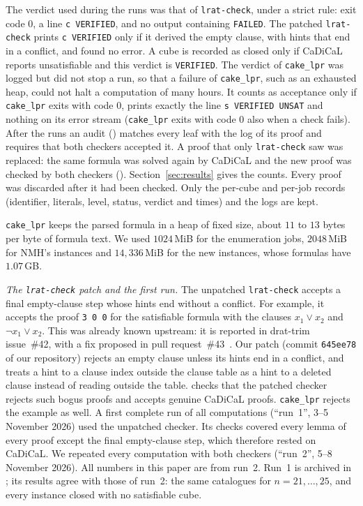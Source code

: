 \documentclass[11pt]{amsart}
\theoremstyle{definition}
\theoremstyle{remark}
\begin{document}
The verdict used during the runs was that of \texttt{lrat-check}, under a
strict rule: exit code $0$, a line \texttt{c VERIFIED}, and no output
containing \texttt{FAILED}. The patched \texttt{lrat-check} prints
\texttt{c VERIFIED} only if it derived the empty clause, with hints that end
in a conflict, and found no error.
A cube is recorded as closed only if CaDiCaL reports unsatisfiable and this
verdict is \texttt{VERIFIED}. The verdict of \texttt{cake\_lpr} was logged
but did not stop a run, so that a failure of \texttt{cake\_lpr}, such as an
exhausted heap, could not halt a computation of many hours. It counts as
acceptance only if \texttt{cake\_lpr} exits with code $0$, prints exactly the
line \texttt{s VERIFIED UNSAT} and nothing on its error stream
(\texttt{cake\_lpr} exits with code $0$ also when a check fails). After the
runs an audit
() matches every leaf with the log of its
proof and requires that both checkers accepted it. A proof that only
\texttt{lrat-check} saw was replaced: the same formula was solved again by
CaDiCaL and the new proof was checked by both checkers
(). Section~\ref{sec:results} gives the
counts. Every proof was discarded after it had been checked. Only the
per-cube and per-job records (identifier, literals, level, status, verdict and
times) and the logs are kept.

\texttt{cake\_lpr} keeps the parsed formula in a heap of fixed size, about
$11$ to $13$ bytes per byte of formula text. We used $1024$\,MiB for the
enumeration jobs, $2048$\,MiB for NMH's instances and $14{,}336$\,MiB for the
new instances, whose formulas have $1.07$\,GB.

\emph{The \texttt{lrat-check} patch and the first run.} The unpatched
\texttt{lrat-check} accepts a final empty-clause step whose hints end
without a conflict. For example, it accepts the proof \texttt{3 0 0} for the
satisfiable formula with the clauses $x_1 \vee x_2$ and $\neg x_1 \vee x_2$.
This was already known upstream: it is reported in drat-trim issue~\#42, with
a fix proposed in pull request~\#43~\cite{drattrim42}. Our patch (commit
\texttt{645ee78} of our repository) rejects an empty clause unless its hints
end in a conflict, and treats a hint to a clause index outside the clause
table as a hint to a deleted clause instead of reading outside the table.
 checks that the patched checker rejects such
bogus proofs and accepts genuine CaDiCaL proofs. \texttt{cake\_lpr} rejects
the example as well. A first complete run of all computations (``run~1'',
3--5 November 2026) used the unpatched checker. Its checks covered every
lemma of every proof except the final empty-clause step, which therefore
rested on CaDiCaL. We repeated every computation with both checkers
(``run~2'', 5--8 November 2026). All numbers in this paper are from run~2.
Run~1 is archived in ; its results agree with those of
run~2: the same catalogues for $n=21,\dots,25$, and every instance closed
with no satisfiable cube.
\end{document}
